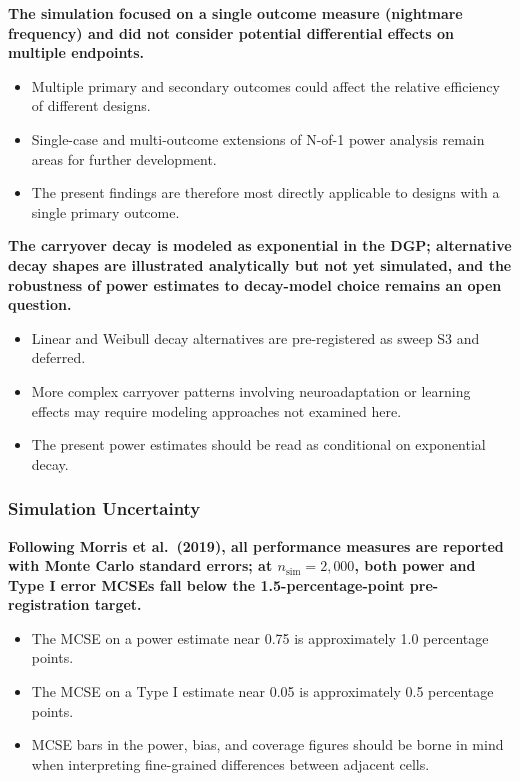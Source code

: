 \documentclass[
  11pt,
]{article}
\begin{document}
\textbf{The simulation focused on a single outcome measure (nightmare frequency) and did not consider potential differential effects on multiple endpoints.}

\begin{itemize}\setlength{\itemsep}{2pt}\setlength{\parskip}{0pt}
\item Multiple primary and secondary outcomes could affect the relative efficiency of different designs.
\item Single-case and multi-outcome extensions of N-of-1 power analysis remain areas for further development.
\item The present findings are therefore most directly applicable to designs with a single primary outcome.
\end{itemize}

\textbf{The carryover decay is modeled as exponential in the DGP; alternative decay shapes are illustrated analytically but not yet simulated, and the robustness of power estimates to decay-model choice remains an open question.}

\begin{itemize}\setlength{\itemsep}{2pt}\setlength{\parskip}{0pt}
\item Linear and Weibull decay alternatives are pre-registered as sweep S3 and deferred.
\item More complex carryover patterns involving neuroadaptation or learning effects may require modeling approaches not examined here.
\item The present power estimates should be read as conditional on exponential decay.
\end{itemize}

\subsubsection{Simulation Uncertainty}\label{simulation-uncertainty}

\textbf{Following Morris et al.\ (2019), all performance measures are reported with Monte Carlo standard errors; at $n_{\text{sim}} = 2{,}000$, both power and Type I error MCSEs fall below the 1.5-percentage-point pre-registration target.}

\begin{itemize}\setlength{\itemsep}{2pt}\setlength{\parskip}{0pt}
\item The MCSE on a power estimate near 0.75 is approximately 1.0 percentage points.
\item The MCSE on a Type I estimate near 0.05 is approximately 0.5 percentage points.
\item MCSE bars in the power, bias, and coverage figures should be borne in mind when interpreting fine-grained differences between adjacent cells.
\end{itemize}
\end{document}
